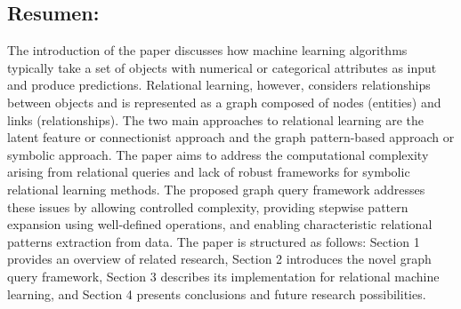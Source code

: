 \documentclass{article}%
\begin{document}
\subsection{Resumen:}%
\label{subsec:Resumen}%
The introduction of the paper discusses how machine learning algorithms typically take a set of objects with numerical or categorical attributes as input and produce predictions. Relational learning, however, considers relationships between objects and is represented as a graph composed of nodes (entities) and links (relationships). The two main approaches to relational learning are the latent feature or connectionist approach and the graph pattern-based approach or symbolic approach. The paper aims to address the computational complexity arising from relational queries and lack of robust frameworks for symbolic relational learning methods. The proposed graph query framework addresses these issues by allowing controlled complexity, providing stepwise pattern expansion using well-defined operations, and enabling characteristic relational patterns extraction from data. The paper is structured as follows: Section 1 provides an overview of related research, Section 2 introduces the novel graph query framework, Section 3 describes its implementation for relational machine learning, and Section 4 presents conclusions and future research possibilities.

%
\end{document}
